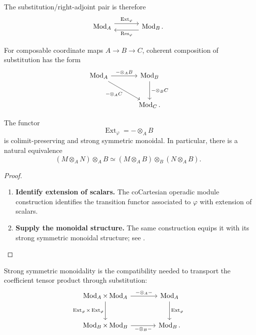 The substitution/right-adjoint pair is therefore
\[
\begin{tikzcd}[column sep=large]
    \Mod_A
        \arrow[r, shift left=1.1ex, "\operatorname{Ext}_{\varphi}"]
    &
    \Mod_B
        \arrow[l, swap, shift left=1.1ex, "\operatorname{Res}_{\varphi}"'].
\end{tikzcd}
\]

For composable coordinate maps \(A\to B\to C\), coherent composition of
substitution has the form
\[
\begin{tikzcd}[column sep=large, row sep=large]
    \Mod_A
        \arrow[r, "-\otimes_AB"]
        \arrow[dr, "-\otimes_AC"']
    &
    \Mod_B
        \arrow[d, "-\otimes_BC"]
    \\
    &
    \Mod_C.
\end{tikzcd}
\]

\begin{proposition}
\label{prop:spectral-base-change-monoidal}
The functor
\[
    \operatorname{Ext}_{\varphi}
    =
    -\otimes_A B
\]
is colimit-preserving and strong symmetric monoidal. In particular, there
is a natural equivalence
\[
    (M\otimes_A N)\otimes_A B
    \simeq
    (M\otimes_A B)
    \otimes_B
    (N\otimes_A B).
\]
\end{proposition}

\begin{proof}
\leavevmode
\begin{enumerate}[label=\textup{(\arabic*)}]
    \item \textbf{Identify extension of scalars.}
    The coCartesian operadic module construction identifies the transition
    functor associated to $\varphi$ with extension of scalars.

    \item \textbf{Supply the monoidal structure.}
    The same construction equips it with its
    strong symmetric monoidal structure; see
    \cite[Theorem~4.5.3.1 and Remark~4.5.3.2]{LurieHigherAlgebra}.
\end{enumerate}
\end{proof}

Strong symmetric monoidality is the compatibility needed to transport the
coefficient tensor product through substitution:
\[
\begin{tikzcd}[column sep=large, row sep=large]
    \Mod_A\times\Mod_A
        \arrow[r, "-\otimes_A-"]
        \arrow[d, "\operatorname{Ext}_{\varphi}\times \operatorname{Ext}_{\varphi}"']
    &
    \Mod_A
        \arrow[d, "\operatorname{Ext}_{\varphi}"]
    \\
    \Mod_B\times\Mod_B
        \arrow[r, "-\otimes_B-"']
    &
    \Mod_B.
\end{tikzcd}
\]

